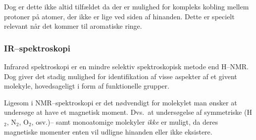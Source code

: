     Dog er dette ikke altid tilfældet da der er mulighed for kompleks kobling mellem protoner på atomer, der ikke er lige ved siden af hinanden. Dette er specielt relevant når det kommer til aromatiske ringe.

    \subsubsection{IR--spektroskopi}
    Infrarød spektroskopi er en mindre selektiv spektroskopisk metode end H--NMR. Dog giver det stadig mulighed for identifikation af visse aspekter af et givent molekyle, hovedsageligt i form af funktionelle grupper.

    Ligesom i NMR--spektroskopi er det nødvendigt for molekylet man ønsker at undersøge at have et magnetisk moment. Dvs.\ at undersøgelse af symmetriske (H$_2$, N$_2$, O$_2$, osv.)-- samt monoatomige molekyler \textit{ikke} er muligt, da deres magnetiske momenter enten vil udligne hinanden eller ikke eksistere.

